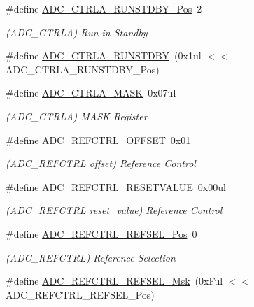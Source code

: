 \begin{DoxyCompactItemize}
\item 
\#define \mbox{\hyperlink{group___s_a_m_d21___a_d_c_ga976523f3fa62e81cab8eff5acd00b190}{A\+D\+C\+\_\+\+C\+T\+R\+L\+A\+\_\+\+R\+U\+N\+S\+T\+D\+B\+Y\+\_\+\+Pos}}~2
\begin{DoxyCompactList}\small\item\em (A\+D\+C\+\_\+\+C\+T\+R\+LA) Run in Standby \end{DoxyCompactList}\item 
\#define \mbox{\hyperlink{group___s_a_m_d21___a_d_c_ga3edf97ead1fc7505c5cfb10c1163c5ed}{A\+D\+C\+\_\+\+C\+T\+R\+L\+A\+\_\+\+R\+U\+N\+S\+T\+D\+BY}}~(0x1ul $<$$<$ A\+D\+C\+\_\+\+C\+T\+R\+L\+A\+\_\+\+R\+U\+N\+S\+T\+D\+B\+Y\+\_\+\+Pos)
\item 
\#define \mbox{\hyperlink{group___s_a_m_d21___a_d_c_ga27d2475024ff104bf51f4575cdbbe276}{A\+D\+C\+\_\+\+C\+T\+R\+L\+A\+\_\+\+M\+A\+SK}}~0x07ul
\begin{DoxyCompactList}\small\item\em (A\+D\+C\+\_\+\+C\+T\+R\+LA) M\+A\+SK Register \end{DoxyCompactList}\item 
\#define \mbox{\hyperlink{group___s_a_m_d21___a_d_c_ga262294683d8f13a4ca4cae27feddbfeb}{A\+D\+C\+\_\+\+R\+E\+F\+C\+T\+R\+L\+\_\+\+O\+F\+F\+S\+ET}}~0x01
\begin{DoxyCompactList}\small\item\em (A\+D\+C\+\_\+\+R\+E\+F\+C\+T\+RL offset) Reference Control \end{DoxyCompactList}\item 
\#define \mbox{\hyperlink{group___s_a_m_d21___a_d_c_ga21a914a31a46e42948558272dc5a5901}{A\+D\+C\+\_\+\+R\+E\+F\+C\+T\+R\+L\+\_\+\+R\+E\+S\+E\+T\+V\+A\+L\+UE}}~0x00ul
\begin{DoxyCompactList}\small\item\em (A\+D\+C\+\_\+\+R\+E\+F\+C\+T\+RL reset\+\_\+value) Reference Control \end{DoxyCompactList}\item 
\#define \mbox{\hyperlink{group___s_a_m_d21___a_d_c_ga7b8a65054da09cd11886d730594eb8d3}{A\+D\+C\+\_\+\+R\+E\+F\+C\+T\+R\+L\+\_\+\+R\+E\+F\+S\+E\+L\+\_\+\+Pos}}~0
\begin{DoxyCompactList}\small\item\em (A\+D\+C\+\_\+\+R\+E\+F\+C\+T\+RL) Reference Selection \end{DoxyCompactList}\item 
\#define \mbox{\hyperlink{group___s_a_m_d21___a_d_c_ga097bcd9a6d5327ca7d482630a5cdd106}{A\+D\+C\+\_\+\+R\+E\+F\+C\+T\+R\+L\+\_\+\+R\+E\+F\+S\+E\+L\+\_\+\+Msk}}~(0x\+Ful $<$$<$ A\+D\+C\+\_\+\+R\+E\+F\+C\+T\+R\+L\+\_\+\+R\+E\+F\+S\+E\+L\+\_\+\+Pos)

\end{DoxyCompactItemize}
